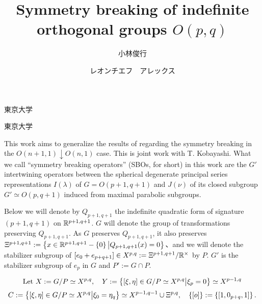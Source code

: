 \documentclass[12pt]{msjproc} %
\theoremstyle{definition}
\theoremstyle{exampstyle} \newtheorem{examp}[theorem]{Theorem}
\renewcommand{\setminus}{-}
\begin{document}
\title{Symmetry breaking of indefinite orthogonal groups $O(p,q)$}

  \author{小林俊行}{東京大学}
  \author{レオンチエフ　アレックス}{東京大学}




  \maketitle

\begin{spacing}{0.8}
	This work aims to generalize the results of \cite{kobayashi2015symmetry}
	regarding the symmetry breaking in the $O(n+1,1)\downarrow O(n,1)$ case. This is joint work with T. Kobayashi.
	What we call ``symmetry breaking operators'' (SBOs, for short) in this work are the $G'$ intertwining operators between the spherical degenerate principal series representations $I(\lambda)$
	of $G=O(p+1,q+1)$ and $J(\nu)$ of its closed subgroup $G'\simeq O(p,q+1)$ induced from maximal parabolic subgroups.
\end{spacing}

Below we will denote by $Q_{p+1,q+1}$ the indefinite quadratic form of signature $(p+1,q+1)$ on $\mathbb{R}^{p+1,q+1}$.
$G$ will denote the group of transformations preserving $Q_{p+1,q+1}$. As $G$ preserves $Q_{p+1,q+1}$, it also preserves
$\Xi^{p+1,q+1}:=\mysetn{x\in\R^{p+1,q+1}\setminus\left\{ 0 \right\}}{Q_{p+1,q+1}(x)=0}$、and we will denote the stabilizer subgroup of 
$[e_0+e_{p+q+1}]\in X^{p,q}:=\Xi^{p+1,q+1}/\mathbb{R}^{\times}$ by
$P$. $G'$ is the stabilizer subgroup of $e_p$ in $G$ and $P':=G\cap P$.

\[
	\mbox{Let }X:=G/P\simeq X^{p,q},\quad Y:=\left\{[\xi,\eta]\in G/P\simeq X^{p,q}\big| \xi_{p}=0\right\}\simeq X^{p-1,q}\]
	\[C:=\left\{[\xi,\eta]\in G/P\simeq X^{p,q}\big| \xi_{0}=\eta_q\right\}\simeq X^{p-1,q-1}\cup\Xi^{p,q},\quad\left\{ [o] \right\}:=\left\{ [1,0_{p+q},1] \right\}.
  \]
\end{document}
